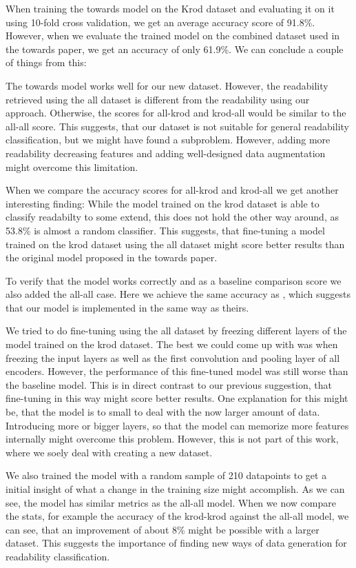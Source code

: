 \documentclass[%
class=scrreprt,
chapterprefix=false,%
open=right,%
twoside=false,%
paper=a4,%
logofile={Logo\_zentral\_farbig\_EN.png},%
thesistype=master,%
UKenglish,%
]{se2thesis}
\begin{document}
	When training the towards model on the Krod dataset and evaluating it on it using 10-fold cross validation, we get an average accuracy score of 91.8\%. However, when we evaluate the trained model on the combined dataset used in the towards paper, we get an accuracy of only 61.9\%. We can conclude a couple of things from this:
	
	The towards model works well for our new dataset. However, the readability retrieved using the all dataset is different from the readability using our approach. Otherwise, the scores for all-krod and krod-all would be similar to the all-all score. This suggests, that our dataset is not suitable for general readability classification, but we might have found a subproblem. However, adding more readability decreasing features and adding well-designed data augmentation might overcome this limitation.
	
	When we compare the accuracy scores for all-krod and krod-all we get another interesting finding: While the model trained on the krod dataset is able to classify readabilty to some extend, this does not hold the other way around, as 53.8\% is almost a random classifier. This suggests, that fine-tuning a model trained on the krod dataset using the all dataset might score better results than the original model proposed in the towards paper.
	
	To verify that the model works correctly and as a baseline comparison score we also added the all-all case. Here we achieve the same accuracy as \citeauthor{mi2022towards}, which suggests that our model is implemented in the same way as theirs.
	
	We tried to do fine-tuning using the all dataset by freezing different layers of the model trained on the krod dataset. The best we could come up with was when freezing the input layers as well as the first convolution and pooling layer of all encoders. However, the performance of this fine-tuned model was still worse than the baseline model. This is in direct contrast to our previous suggestion, that fine-tuning in this way might score better results. One explanation for this might be, that the model is to small to deal with the now larger amount of data. Introducing more or bigger layers, so that the model can memorize more features internally might overcome this problem. However, this is not part of this work, where we soely deal with creating a new dataset.

	We also trained the model with a random sample of 210 datapoints to get a initial insight of what a change in the training size might accomplish. As we can see, the model has similar metrics as the all-all model. When we now compare the stats, for example the accuracy of the krod-krod against the all-all model, we can see, that an improvement of about 8\% might be possible with a larger dataset. This suggests the importance of finding new ways of data generation for readability classification.
		
\end{document}
